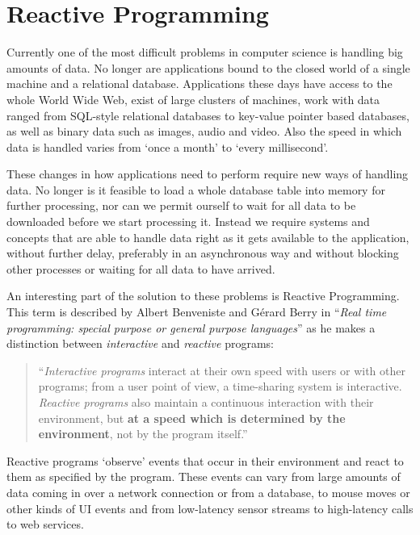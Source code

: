 \section{Reactive Programming}
\label{sec:reactive-programming}
Currently one of the most difficult problems in computer science is handling big amounts of data. No longer are applications bound to the closed world of a single machine and a relational database. Applications these days have access to the whole World Wide Web, exist of large clusters of machines, work with data ranged from SQL-style relational databases to key-value pointer based databases, as well as binary data such as images, audio and video. Also the speed in which data is handled varies from `once a month' to `every millisecond'.

These changes in how applications need to perform require new ways of handling data. No longer is it feasible to load a whole database table into memory for further processing, nor can we permit ourself to wait for all data to be downloaded before we start processing it. Instead we require systems and concepts that are able to handle data right as it gets available to the application, without further delay, preferably in an asynchronous way and without blocking other processes or waiting for all data to have arrived. \cite{meijer2012-YMIAD}

An interesting part of the solution to these problems is Reactive Programming. This term is described by Albert Benveniste and G\'erard Berry in ``\textit{Real time programming: special purpose or general purpose languages}'' \cite{berry1991-Reactive} as he makes a distinction between \textit{interactive} and \textit{reactive} programs:

\begin{quote}
``\textit{Interactive programs} interact at their own speed with users or with other programs; from a user point of view, a time-sharing system is interactive. \textit{Reactive programs} also maintain a continuous interaction with their environment, but \textbf{at a speed which is determined by the environment}, not by the program itself.''
\end{quote}

Reactive programs `observe' events that occur in their environment and react to them as specified by the program. These events can vary from large amounts of data coming in over a network connection or from a database, to mouse moves or other kinds of UI events and from low-latency sensor streams to high-latency calls to web services.

